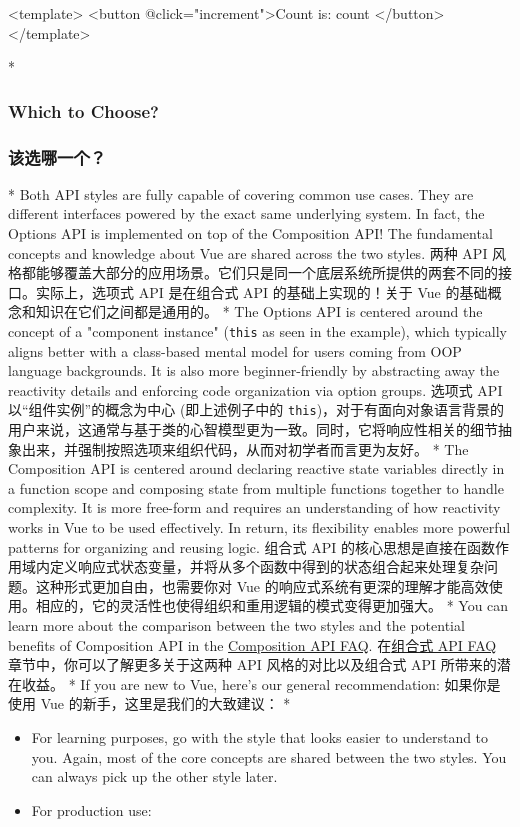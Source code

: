 \begin{paracol}{2}
\begin{codeVue}
    <template>
      <button @click="increment">Count is: {{ count }}</button>
    </template>
\end{codeVue}    
\switchcolumn[0]*%
\subsubsection{Which to Choose?}
\switchcolumn
\subsubsection{该选哪一个？}
\switchcolumn[0]*%
Both API styles are fully capable of covering common use cases. They are
different interfaces powered by the exact same underlying system. In
fact, the Options API is implemented on top of the Composition API! The
fundamental concepts and knowledge about Vue are shared across the two
styles.
\switchcolumn
两种 API
风格都能够覆盖大部分的应用场景。它们只是同一个底层系统所提供的两套不同的接口。实际上，选项式
API 是在组合式 API 的基础上实现的！关于 Vue
的基础概念和知识在它们之间都是通用的。
\switchcolumn[0]*%
The Options API is centered around the concept of a "component instance"
(\texttt{this} as seen in the example), which typically aligns better
with a class-based mental model for users coming from OOP language
backgrounds. It is also more beginner-friendly by abstracting away the
reactivity details and enforcing code organization via option groups.
\switchcolumn
选项式 API 以``组件实例''的概念为中心 (即上述例子中的
\texttt{this})，对于有面向对象语言背景的用户来说，这通常与基于类的心智模型更为一致。同时，它将响应性相关的细节抽象出来，并强制按照选项来组织代码，从而对初学者而言更为友好。
\switchcolumn[0]*%
The Composition API is centered around declaring reactive state
variables directly in a function scope and composing state from multiple
functions together to handle complexity. It is more free-form and
requires an understanding of how reactivity works in Vue to be used
effectively. In return, its flexibility enables more powerful patterns
for organizing and reusing logic.
\switchcolumn
组合式 API
的核心思想是直接在函数作用域内定义响应式状态变量，并将从多个函数中得到的状态组合起来处理复杂问题。这种形式更加自由，也需要你对
Vue
的响应式系统有更深的理解才能高效使用。相应的，它的灵活性也使得组织和重用逻辑的模式变得更加强大。
\switchcolumn[0]*%
You can learn more about the comparison between the two styles and the
potential benefits of Composition API in the
\href{https://vuejs.org/guide/extras/composition-api-faq}{Composition
API FAQ}.
\switchcolumn
在\href{https://cn.vuejs.org/guide/extras/composition-api-faq.html}{组合式
API FAQ} 章节中，你可以了解更多关于这两种 API 风格的对比以及组合式 API
所带来的潜在收益。
\switchcolumn[0]*%
If you are new to Vue, here's our general recommendation:
\switchcolumn
如果你是使用 Vue 的新手，这里是我们的大致建议：
\switchcolumn[0]*%
\begin{itemize}
\item
For learning purposes, go with the style that looks easier to
understand to you. Again, most of the core concepts are shared between
the two styles. You can always pick up the other style later.
\item
For production use:


\end{itemize}
\end{paracol}
